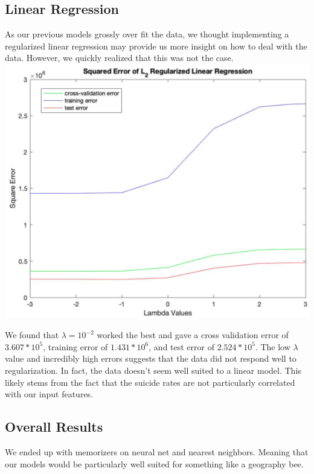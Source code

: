 \documentclass{article}
\begin{document}
\begin{multicols}{2}
\subsection{Linear Regression} As our previous models grossly over fit the data, we thought implementing a regularized linear regression may provide us more insight on how to deal with the data. However, we quickly realized that this was not the case.
\begingroup
    \includegraphics[width=\columnwidth]{lin_reg.png}
    \begin{spacing}{1.2}
    \label{fig:lin_reg_model} 
    \end{spacing}
\endgroup

We found that $\lambda = 10^{-2}$ worked the best and gave a cross validation error of $3.607 * 10^5$, training error of $1.431* 10^6$, and test error of $2.524 * 10^5$. The low $\lambda$ value and incredibly high errors suggests that the data did not respond well to regularization. In fact, the data doesn't seem well suited to a linear model. This likely stems from the fact that the suicide rates are not particularly correlated with our input features. 



\subsection{Overall Results}

We ended up with memorizers on neural net and nearest neighbors. Meaning that our models would be particularly well suited for something like a geography bee. 



\end{multicols}
\end{document}
